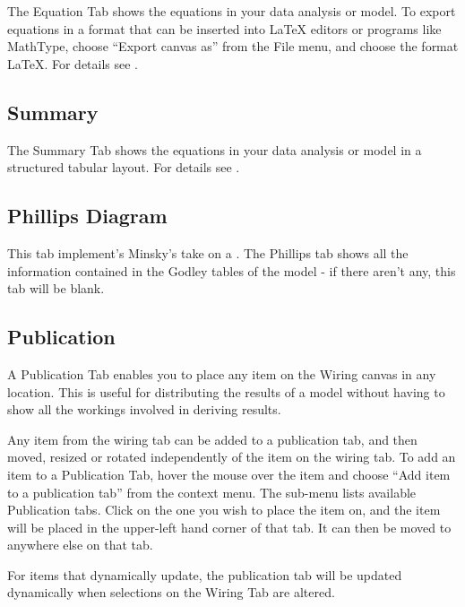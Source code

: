 The Equation Tab shows the equations in your data analysis or model.
To export equations in a format that can be inserted into \LaTeX{} editors
or programs like MathType, choose ``Export canvas as'' from the
File menu, and choose the format LaTeX. For details see .

\subsection{Summary}

The Summary Tab shows the equations in your data analysis or model
in a structured tabular layout. For details see .

\subsection{Phillips Diagram}

\label{tabs:Phillips}

This tab implement's Minsky's take on a . The
Phillips tab shows all the information contained in the Godley tables
of the model - if there aren't any, this tab will be blank.

\subsection{Publication }

\label{tabs:Publication}

A Publication Tab enables you to place any item on the Wiring canvas
in any location. This is useful for distributing the results of a
model without having to show all the workings involved in deriving
results.

Any item from the wiring tab can be added to a publication tab, and
then moved, resized or rotated independently of the item on the wiring
tab. To add an item to a Publication Tab, hover the mouse over the
item and choose ``Add item to a publication tab'' from the context
menu. The sub-menu lists available Publication tabs. Click on the
one you wish to place the item on, and the item will be placed in
the upper-left hand corner of that tab. It can then be moved to anywhere
else on that tab.

For items that dynamically update, the publication tab will be updated
dynamically when selections on the Wiring Tab are altered.

